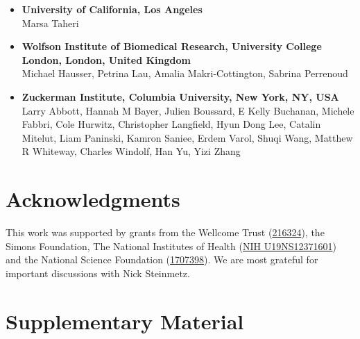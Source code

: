 \documentclass[10pt,lineno]{elife}
\begin{document}
\begin{itemize}
  Karel Svoboda
  \item \textbf{University of California, Los Angeles}\\
  Marsa Taheri
  \item \textbf{Wolfson Institute of Biomedical Research, University College London, London, United Kingdom}\\
  Michael Hausser, Petrina Lau, Amalia Makri-Cottington, Sabrina Perrenoud
  \item \textbf{Zuckerman Institute, Columbia University, New York, NY, USA}\\
  Larry Abbott, Hannah M Bayer, Julien Boussard, E Kelly Buchanan, Michele Fabbri, Cole Hurwitz, Christopher Langfield, Hyun Dong Lee, Catalin Mitelut, Liam Paninski, Kamron Saniee, Erdem Varol, Shuqi Wang, Matthew R Whiteway, Charles Windolf, Han Yu, Yizi Zhang
\end{itemize}

\section{Acknowledgments}
This work was supported by grants from the Wellcome Trust (\href{https://ror.org/029chgv08}{216324}), the Simons Foundation, The National Institutes of Health (\href{https://ror.org/01cwqze88}{NIH U19NS12371601}) and the National Science Foundation (\href{https://ror.org/021nxhr62NSF}{1707398}). We are most grateful for important discussions with Nick Steinmetz. 


\FloatBarrier
\section{Supplementary Material}

\end{document}
